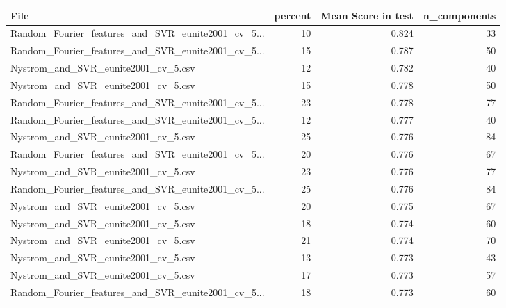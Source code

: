 \begin{tabularx}{\textwidth}{lrrr}
\toprule
                                              File &  percent &  Mean Score in test &  n\_components \\
\midrule
Random\_Fourier\_features\_and\_SVR\_eunite2001\_cv\_5... &       10 &               0.824 &            33 \\
Random\_Fourier\_features\_and\_SVR\_eunite2001\_cv\_5... &       15 &               0.787 &            50 \\
               Nystrom\_and\_SVR\_eunite2001\_cv\_5.csv &       12 &               0.782 &            40 \\
               Nystrom\_and\_SVR\_eunite2001\_cv\_5.csv &       15 &               0.778 &            50 \\
Random\_Fourier\_features\_and\_SVR\_eunite2001\_cv\_5... &       23 &               0.778 &            77 \\
Random\_Fourier\_features\_and\_SVR\_eunite2001\_cv\_5... &       12 &               0.777 &            40 \\
               Nystrom\_and\_SVR\_eunite2001\_cv\_5.csv &       25 &               0.776 &            84 \\
Random\_Fourier\_features\_and\_SVR\_eunite2001\_cv\_5... &       20 &               0.776 &            67 \\
               Nystrom\_and\_SVR\_eunite2001\_cv\_5.csv &       23 &               0.776 &            77 \\
Random\_Fourier\_features\_and\_SVR\_eunite2001\_cv\_5... &       25 &               0.776 &            84 \\
               Nystrom\_and\_SVR\_eunite2001\_cv\_5.csv &       20 &               0.775 &            67 \\
               Nystrom\_and\_SVR\_eunite2001\_cv\_5.csv &       18 &               0.774 &            60 \\
               Nystrom\_and\_SVR\_eunite2001\_cv\_5.csv &       21 &               0.774 &            70 \\
               Nystrom\_and\_SVR\_eunite2001\_cv\_5.csv &       13 &               0.773 &            43 \\
               Nystrom\_and\_SVR\_eunite2001\_cv\_5.csv &       17 &               0.773 &            57 \\
Random\_Fourier\_features\_and\_SVR\_eunite2001\_cv\_5... &       18 &               0.773 &            60 \\

\end{tabularx}
